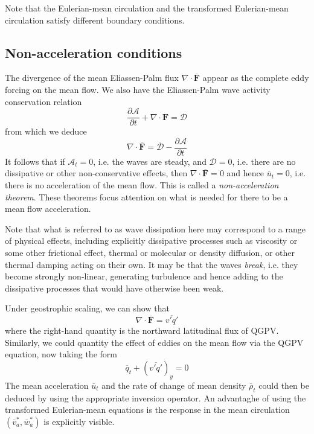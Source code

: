 \documentclass{jknotes}
\begin{document}
Note that the Eulerian-mean circulation and the transformed Eulerian-mean
circulation satisfy different boundary conditions.

\subsection{Non-acceleration conditions}
The divergence of the mean Eliassen-Palm flux $\nabla \cdot
\overline{\symbf{F}}$ appear as the complete eddy forcing on the mean flow. We
also have the Eliassen-Palm wave activity conservation relation
\begin{equation}
	\frac{\partial \mathcal{A}}{\partial t} + \nabla \cdot \symbf{F} =
	\mathcal{D}
\end{equation}
from which we deduce
\begin{equation}
	\nabla \cdot \overline{\symbf{F}} = \overline{\mathcal{D}} -
	\frac{\partial \mathcal{A}}{\partial t}
\end{equation}
It follows that if $\mathcal{A}_t = 0$, i.e. the waves are steady, and
$\mathcal{D} = 0$, i.e. there are no dissipative or other non-conservative
effects, then $\nabla \cdot \overline{\symbf{F}} = 0$ and hence
$\overline{u}_t = 0$, i.e. there is no acceleration of the mean flow. This is
called a \emph{non-acceleration theorem}. These theorems focus attention on
what is needed for there to be a mean flow acceleration.

Note that what is referred to as wave dissipation here may correspond to a
range of physical effects, including explicitly dissipative processes such as
viscosity or some other frictional effect, thermal or molecular or density
diffusion, or other thermal damping acting on their own. It may be that the
waves \emph{break}, i.e. they become strongly non-linear, generating
turbulence and hence adding to the dissipative processes that would have
otherwise been weak.

Under geostrophic scaling, we can show that
\begin{equation}
	\nabla \cdot \overline{\symbf{F}} = \overline{v'q'}
\end{equation}
where the right-hand quantity is the northward latitudinal flux of QGPV.
Similarly, we could quantity the effect of eddies on the mean flow via the
QGPV equation, now taking the form
\begin{equation}
	\overline{q}_t + (\overline{v'q'})_y = 0
\end{equation}
The mean acceleration $\overline{u}_t$ and the rate of change of mean density
$\overline{\rho}_t$ could then be deduced by using the appropriate inversion
operator. An advantaghe of using the transformed Eulerian-mean equations is
the response in the mean circulation $(\overline{v}_a^*, \overline{w}_a^*)$ is
explicitly visible.
\end{document}
